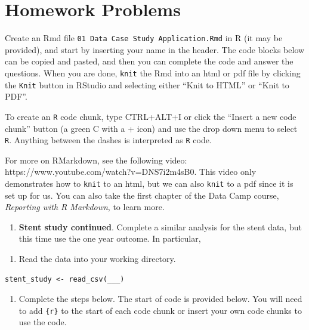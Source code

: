 \documentclass[
  letterpaper,
  DIV=11,
  numbers=noendperiod]{scrreprt}
\providecommand{\tightlist}{%
  \setlength{\itemsep}{0pt}\setlength{\parskip}{0pt}}\usepackage{longtable,booktabs,array}
\begin{document}
\section{Homework Problems}\label{homework-problems}

Create an Rmd file \texttt{01\ Data\ Case\ Study\ Application.Rmd} in R
(it may be provided), and start by inserting your name in the header.
The code blocks below can be copied and pasted, and then you can
complete the code and answer the questions. When you are done,
\texttt{knit} the Rmd into an html or pdf file by clicking the
\texttt{Knit} button in RStudio and selecting either ``Knit to HTML'' or
``Knit to PDF''.

To create an \texttt{R} code chunk, type CTRL+ALT+I or click the
``Insert a new code chunk'' button (a green C with a + icon) and use the
drop down menu to select \texttt{R}. Anything between the dashes is
interpreted as \texttt{R} code.

For more on RMarkdown, see the following video:
https://www.youtube.com/watch?v=DNS7i2m4sB0. This video only
demonstrates how to \texttt{knit} to an html, but we can also
\texttt{knit} to a pdf since it is set up for us. You can also take the
first chapter of the Data Camp course, \emph{Reporting with R Markdown},
to learn more.

\begin{enumerate}
\def\labelenumi{\arabic{enumi}.}
\tightlist
\item
  \textbf{Stent study continued}. Complete a similar analysis for the
  stent data, but this time use the one year outcome. In particular,
\end{enumerate}

\begin{enumerate}
\def\labelenumi{\alph{enumi}.}
\tightlist
\item
  Read the data into your working directory.
\end{enumerate}

\begin{verbatim}
stent_study <- read_csv(___)
\end{verbatim}

\begin{enumerate}
\def\labelenumi{\alph{enumi}.}
\setcounter{enumi}{1}
\tightlist
\item
  Complete the steps below. The start of code is provided below. You
  will need to add \texttt{\{r\}} to the start of each code chunk or
  insert your own code chunks to use the code.
\end{enumerate}
\end{document}
